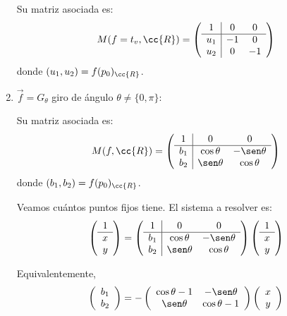 \begin{enumerate}
    Su matriz asociada es:
    \begin{equation*}
        M(f=t_v,\cc{R}) = \left(\begin{array}{c|cc}
            1 & 0 & 0 \\ \hline
            u_1 & -1 & 0 \\ 
            u_2 & 0 & -1
        \end{array}\right)
    \end{equation*}
    donde $(u_1,u_2)=f(p_0)_{\cc{R}}$.

    \item $\vec{f}=G_{\theta}$ giro de ángulo $\theta \neq \{0,\pi\}$:
    
    Su matriz asociada es:
    \begin{equation*}
        M(f,\cc{R}) = \left(\begin{array}{c|cc}
            1 & 0 & 0 \\ \hline
            b_1 & \cos\theta & -\sen\theta \\ 
            b_2 & \sen\theta & \cos\theta
        \end{array}\right)
    \end{equation*}
    donde $(b_1,b_2)=f(p_0)_{\cc{R}}$.

    Veamos cuántos puntos fijos tiene. El sistema a resolver es:
    \begin{equation*}
        \left(\begin{array}{c}
            1 \\ \hline x \\ y
        \end{array}\right)
        = \left(\begin{array}{c|cc}
            1 & 0 & 0 \\ \hline
            b_1 & \cos\theta & -\sen\theta \\ 
            b_2 & \sen\theta & \cos\theta
        \end{array}\right)
        \left(\begin{array}{c}
            1 \\ \hline x \\ y
        \end{array}\right)
    \end{equation*}

    Equivalentemente,
    \begin{equation*}
        \left(\begin{array}{c}
            b_1 \\ b_2
        \end{array}\right)
        = -\left(\begin{array}{cc}
            \cos\theta-1 & -\sen\theta \\ 
            \sen\theta & \cos\theta-1
        \end{array}\right)
        \left(\begin{array}{c}
            x \\ y
        \end{array}\right)
    \end{equation*}


\end{enumerate}
